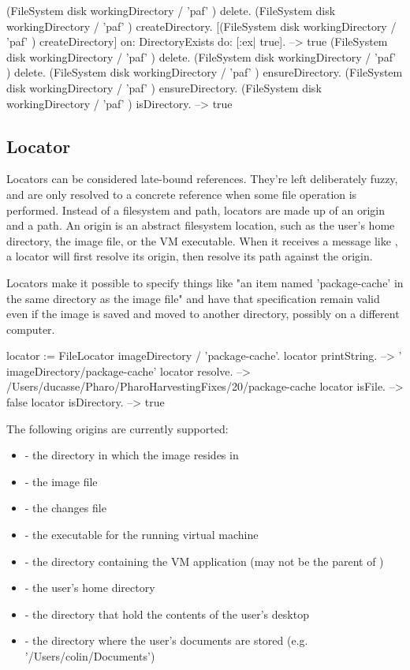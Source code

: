 \documentclass[a4paper,10pt,twoside]{book}
\begin{document}
\begin{code}{}
(FileSystem disk workingDirectory / 'paf' ) delete.
(FileSystem disk workingDirectory / 'paf' ) createDirectory.
[(FileSystem disk workingDirectory / 'paf' ) createDirectory] on: DirectoryExists do: [:ex| true].
	--> true
(FileSystem disk workingDirectory / 'paf' ) delete.
(FileSystem disk workingDirectory / 'paf' ) delete.
(FileSystem disk workingDirectory / 'paf' ) ensureDirectory.
(FileSystem disk workingDirectory / 'paf' ) ensureDirectory.
(FileSystem disk workingDirectory / 'paf' ) isDirectory.
  --> true
\end{code}

\subsection{Locator}

Locators can be considered late-bound references. They're left deliberately fuzzy, and are only resolved to a concrete reference when some file operation is performed. Instead of a filesystem and path, locators are made up of an origin and a path. An origin is an abstract filesystem location, such as the user's home directory, the image file, or the VM executable. When it receives a message like , a locator will first resolve its origin, then resolve its path against the origin.

Locators make it possible to specify things like "an item named 'package-cache' in the same directory as the image file" and have that specification remain valid even if the image is saved and moved to another directory, possibly on a different computer.

\begin{code}{}
    locator := FileLocator imageDirectory / 'package-cache'.
    locator printString.             --> ' {imageDirectory}/package-cache'
    locator resolve.                 -->  /Users/ducasse/Pharo/PharoHarvestingFixes/20/package-cache
    locator isFile.                  --> false
    locator isDirectory.             --> true
\end{code}	

The following origins are currently supported:

\begin{itemize}
\item {} - the directory in which the image resides in
\item{} - the image file
\item{} - the changes file
\item{} - the executable for the running virtual machine
\item{} - the directory containing the VM application (may not be the parent of )
\item{} - the user's home directory
\item{} - the directory that hold the contents of the user's desktop
\item{} - the directory where the user's documents are stored (e.g. '/Users/colin/Documents')
\end{itemize}
\end{document}
